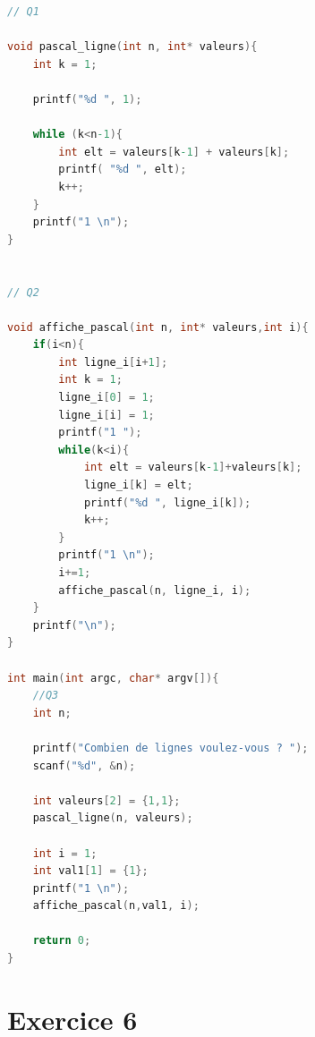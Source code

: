 \documentclass{article}
\begin{document}
\begin{lstlisting}[language=C, caption={Binomial coefficients}]
    // Q1 

void pascal_ligne(int n, int* valeurs){
    int k = 1; 
    
    printf("%d ", 1); 
    
    while (k<n-1){
        int elt = valeurs[k-1] + valeurs[k]; 
        printf( "%d ", elt);  
        k++; 
    }
    printf("1 \n");
}


// Q2 

void affiche_pascal(int n, int* valeurs,int i){ 
    if(i<n){
        int ligne_i[i+1]; 
        int k = 1; 
        ligne_i[0] = 1; 
        ligne_i[i] = 1;
        printf("1 ");
        while(k<i){
            int elt = valeurs[k-1]+valeurs[k]; 
            ligne_i[k] = elt; 
            printf("%d ", ligne_i[k]); 
            k++;
        }
        printf("1 \n"); 
        i+=1;
        affiche_pascal(n, ligne_i, i); 
    }
    printf("\n");
}

int main(int argc, char* argv[]){
    //Q3 
    int n;

    printf("Combien de lignes voulez-vous ? ");
    scanf("%d", &n);

    int valeurs[2] = {1,1}; 
    pascal_ligne(n, valeurs); 

    int i = 1;
    int val1[1] = {1};
    printf("1 \n");
    affiche_pascal(n,val1, i); 

    return 0; 
}
\end{lstlisting}

\section*{\textbf{Exercice 6}}
\end{document}

